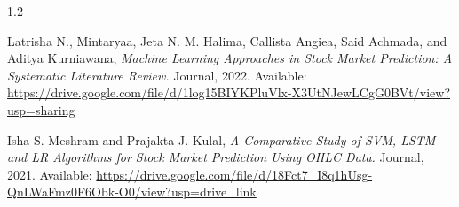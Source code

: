 \documentclass[12pt, a4paper]{report}
\begin{document}
\begin{spacing}{1.2}
\begin{enumerate}[label={[ \arabic* ]}]
\item Latrisha N., Mintaryaa, Jeta N. M. Halima, Callista Angiea, Said Achmada, and Aditya Kurniawana,
\textit{Machine Learning Approaches in Stock Market Prediction: A Systematic Literature Review.}
Journal, 2022.  
Available: \url{https://drive.google.com/file/d/1log15BIYKPluVlx-X3UtNJewLCgG0BVt/view?usp=sharing}

\item Isha S. Meshram and Prajakta J. Kulal,
\textit{A Comparative Study of SVM, LSTM and LR Algorithms for Stock Market Prediction Using OHLC Data.}
Journal, 2021.  
Available: \url{https://drive.google.com/file/d/18Fct7_I8q1hUsg-QnLWaFmz0F6Obk-O0/view?usp=drive_link}

\end{enumerate}
\endgroup



\end{spacing}
\end{document}
